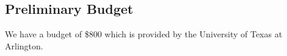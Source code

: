 \subsection{Preliminary Budget}
We have a budget of \$800 which is provided by the University of Texas at Arlington.